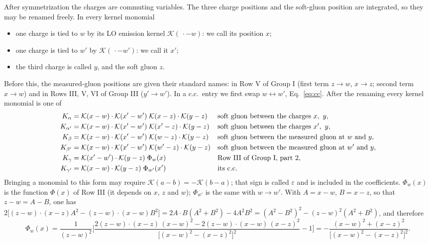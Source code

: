 \documentclass[10pt]{article}
\numberwithin{equation}{section}
\newcommand{\KK}{\mathcal K}
\begin{document}
After symmetrization the charges are commuting variables. The three charge positions and the soft-gluon position are integrated, so they may be renamed freely. In every kernel monomial
\begin{itemize}
\item one charge is tied to $w$ by its LO emission kernel $\KK(\,\cdot-w)$: we call its position $x$;
\item one charge is tied to $w'$ by $\KK(\,\cdot-w')$: we call it $x'$;
\item the third charge is called $y$, and the soft gluon $z$.
\end{itemize}
Before this, the measured-gluon positions are given their standard names: in Row V of Group I (first term $z\to w$, $x\to z$; second term $x\to w$) and in Rows III, V, VI of Group III ($y'\to w'$). In a c.c.\ entry we first swap $w\leftrightarrow w'$, Eq.~\eqref{eq:cc}. After the renaming every kernel monomial is one of
\begin{align}
K_\alpha&=\KK(x-w)\cdot\KK(x'-w')\;\KK(x-z)\cdot\KK(y-z) &&\text{soft gluon between the charges }x,\ y,\notag\\
K_{\alpha'}&=\KK(x-w)\cdot\KK(x'-w')\;\KK(x'-z)\cdot\KK(y-z) &&\text{soft gluon between the charges }x',\ y,\notag\\
K_\beta&=\KK(x-w)\cdot\KK(x'-w')\;\KK(w-z)\cdot\KK(y-z) &&\text{soft gluon between the measured gluon at }w\text{ and }y,\notag\\
K_{\beta'}&=\KK(x-w)\cdot\KK(x'-w')\;\KK(w'-z)\cdot\KK(y-z) &&\text{soft gluon between the measured gluon at }w'\text{ and }y,\notag\\
K_\gamma&=\KK(x'-w')\cdot\KK(y-z)\;\Phi_w(x) &&\text{Row III of Group I, part 2,}\notag\\
K_{\gamma'}&=\KK(x-w)\cdot\KK(y-z)\;\Phi_{w'}(x') &&\text{its c.c.}
\label{C:eq:classes}
\end{align}
Bringing a monomial to this form may require $\KK(a-b)=-\KK(b-a)$; that sign is called $\varepsilon$ and is included in the coefficients. $\Phi_w(x)$ is the function $\Phi(x)$ of Row III (it depends on $x$, $z$ and $w$); $\Phi_{w'}$ is the same with $w\to w'$. With $A=x-w$, $B=x-z$, so that $z-w=A-B$, one has $2\big[(z-w)\cdot(x-z)A^2-(z-w)\cdot(x-w)B^2\big]=2A\cdot B(A^2+B^2)-4A^2B^2=(A^2-B^2)^2-(z-w)^2(A^2+B^2)$, and therefore
\begin{equation}
\Phi_w(x)=\frac{1}{(z-w)^2}\bigg[\frac{2(z-w)\cdot(x-z)\,(x-w)^2-2(z-w)\cdot(x-w)\,(x-z)^2}{\big[(x-w)^2-(x-z)^2\big]^2}-1\bigg]=-\frac{(x-w)^2+(x-z)^2}{\big[(x-w)^2-(x-z)^2\big]^2}.
\label{C:eq:Phi}
\end{equation}
\end{document}
